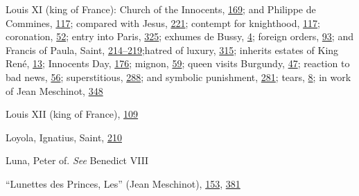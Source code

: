 Louis XI (king of France): Church of the Innocents,
\protect\hyperlink{12_Chapter_Five__THE_VISION_OF_DEAT.xhtmlux5cux23page_169}{169};
and Philippe de Commines,
\protect\hyperlink{10_Chapter_Three__THE_HEROIC_DREAM.xhtmlux5cux23page_117}{117};
compared with Jesus,
\protect\hyperlink{15_Chapter_Eight__RELIGIOUS_EXCITAT.xhtmlux5cux23page_221}{221};
contempt for knighthood,
\protect\hyperlink{10_Chapter_Three__THE_HEROIC_DREAM.xhtmlux5cux23page_117}{117};
coronation,
\protect\hyperlink{09_Chapter_Two__THE_CRAVING_FOR_A_M.xhtmlux5cux23page_52}{52};
entry into Paris,
\protect\hyperlink{20_ILLUSTRATIONS_FOLLOW_PAGE.xhtmlux5cux23page_325}{325};
exhumes de Bussy,
\protect\hyperlink{08_Chapter_One__THE_PASSIONATE_INTE.xhtmlux5cux23page_4}{4};
foreign orders,
\protect\hyperlink{10_Chapter_Three__THE_HEROIC_DREAM.xhtmlux5cux23page_93}{93};
and Francis of Paula, Saint,
\protect\hyperlink{14_Chapter_Seven__THE_PIOUS_PERSONA.xhtmlux5cux23page_214}{214--}\protect\hyperlink{14_Chapter_Seven__THE_PIOUS_PERSONA.xhtmlux5cux23page_219}{219};\protect\hypertarget{25_INDEX.xhtmlux5cux23page_461}{}{}hatred
of luxury,
\protect\hyperlink{20_ILLUSTRATIONS_FOLLOW_PAGE.xhtmlux5cux23page_315}{315};
inherits estates of King René,
\protect\hyperlink{08_Chapter_One__THE_PASSIONATE_INTE.xhtmlux5cux23page_13}{13};
Innocents Day,
\protect\hyperlink{13_Chapter_Six__THE_DEPICTION_OF_TH.xhtmlux5cux23page_176}{176};
mignon,
\protect\hyperlink{09_Chapter_Two__THE_CRAVING_FOR_A_M.xhtmlux5cux23page_59}{59};
queen visits Burgundy,
\protect\hyperlink{09_Chapter_Two__THE_CRAVING_FOR_A_M.xhtmlux5cux23page_47}{47};
reaction to bad news,
\protect\hyperlink{09_Chapter_Two__THE_CRAVING_FOR_A_M.xhtmlux5cux23page_56}{56};
superstitious,
\protect\hyperlink{18_Chapter_Eleven__THE_FORMS_OF_THO.xhtmlux5cux23page_288}{288};
and symbolic punishment,
\protect\hyperlink{18_Chapter_Eleven__THE_FORMS_OF_THO.xhtmlux5cux23page_281}{281};
tears,
\protect\hyperlink{08_Chapter_One__THE_PASSIONATE_INTE.xhtmlux5cux23page_8}{8};
in work of Jean Meschinot,
\protect\hyperlink{21_Chapter_Thirteen__IMAGE_AND_WORD.xhtmlux5cux23page_348}{348}

Louis XII (king of France),
\protect\hyperlink{10_Chapter_Three__THE_HEROIC_DREAM.xhtmlux5cux23page_109}{109}

Loyola, Ignatius, Saint,
\protect\hyperlink{14_Chapter_Seven__THE_PIOUS_PERSONA.xhtmlux5cux23page_210}{210}

Luna, Peter of. \emph{See} Benedict VIII

``Lunettes des Princes, Les'' (Jean Meschinot),
\protect\hyperlink{11_Chapter_Four__THE_FORMS_OF_LOVE.xhtmlux5cux23page_153}{153},
\protect\hyperlink{21_Chapter_Thirteen__IMAGE_AND_WORD.xhtmlux5cux23page_381}{381}

